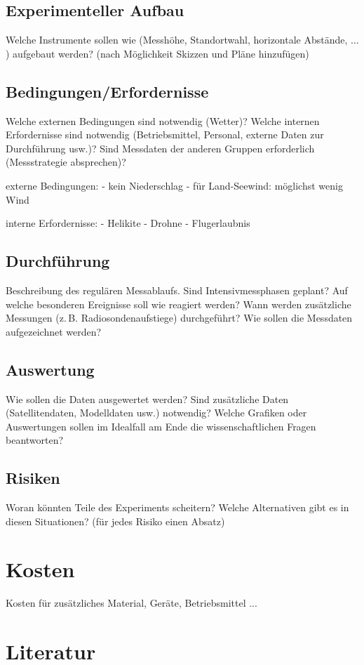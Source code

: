 \documentclass[a4paper,11pt,DIV=calc,tablecaptionabove,headinclude,twoside]{article}
\begin{document}
\subsection{Experimenteller Aufbau}
Welche Instrumente sollen wie (Messhöhe, Standortwahl, horizontale Abstände, ... ) aufgebaut werden? (nach Möglichkeit Skizzen und Pläne hinzufügen)

\subsection{Bedingungen/Erfordernisse}
Welche externen Bedingungen sind notwendig (Wetter)? Welche internen Erfordernisse sind notwendig (Betriebsmittel, Personal, externe Daten zur Durchführung usw.)? Sind Messdaten der anderen Gruppen erforderlich (Messstrategie absprechen)?

externe Bedingungen:
- kein Niederschlag
- für Land-Seewind: möglichst wenig Wind

interne Erfordernisse:
- Helikite
- Drohne
- Flugerlaubnis

\subsection{Durchführung}
Beschreibung des regulären Messablaufs. Sind Intensivmessphasen geplant? Auf welche besonderen Ereignisse soll wie reagiert werden? 
Wann werden zusätzliche Messungen (z.\,B. Radiosondenaufstiege) durchgeführt?
Wie sollen die Messdaten aufgezeichnet werden? 

\subsection{Auswertung}
Wie sollen die Daten ausgewertet werden? Sind zusätzliche Daten (Satellitendaten, Modelldaten usw.) notwendig? Welche Grafiken oder Auswertungen sollen im Idealfall am Ende die wissenschaftlichen Fragen beantworten?

\subsection{Risiken}
Woran könnten Teile des Experiments scheitern? Welche Alternativen gibt es in diesen Situationen? (für jedes Risiko einen Absatz)

\section{Kosten}
Kosten für zusätzliches Material, Geräte, Betriebsmittel ...

\section*{Literatur}
\end{document}
